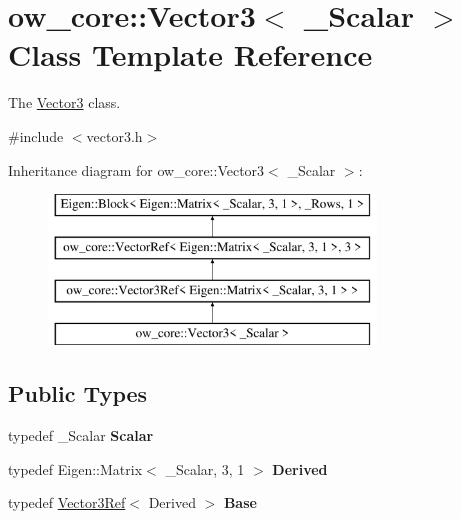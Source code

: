\hypertarget{classow__core_1_1Vector3}{}\section{ow\+\_\+core\+:\+:Vector3$<$ \+\_\+\+Scalar $>$ Class Template Reference}
\label{classow__core_1_1Vector3}


The \hyperlink{classow__core_1_1Vector3}{Vector3} class.  




{\ttfamily \#include $<$vector3.\+h$>$}

Inheritance diagram for ow\+\_\+core\+:\+:Vector3$<$ \+\_\+\+Scalar $>$\+:\begin{figure}[H]
\begin{center}
\leavevmode
\includegraphics[height=4.000000cm]{df/dc3/classow__core_1_1Vector3}
\end{center}
\end{figure}
\subsection*{Public Types}
\begin{DoxyCompactItemize}
\item 
typedef \+\_\+\+Scalar {\bfseries Scalar}\hypertarget{classow__core_1_1Vector3_a13a53dc729069a5c30a2c188bbbffbe4}{}\label{classow__core_1_1Vector3_a13a53dc729069a5c30a2c188bbbffbe4}

\item 
typedef Eigen\+::\+Matrix$<$ \+\_\+\+Scalar, 3, 1 $>$ {\bfseries Derived}\hypertarget{classow__core_1_1Vector3_ae043e39ab4ca8568831379647aeaa20b}{}\label{classow__core_1_1Vector3_ae043e39ab4ca8568831379647aeaa20b}

\item 
typedef \hyperlink{classow__core_1_1Vector3Ref}{Vector3\+Ref}$<$ Derived $>$ {\bfseries Base}\hypertarget{classow__core_1_1Vector3_a2eecdfd19c036b760f0a727fe5c60ba1}{}\label{classow__core_1_1Vector3_a2eecdfd19c036b760f0a727fe5c60ba1}

\end{DoxyCompactItemize}
